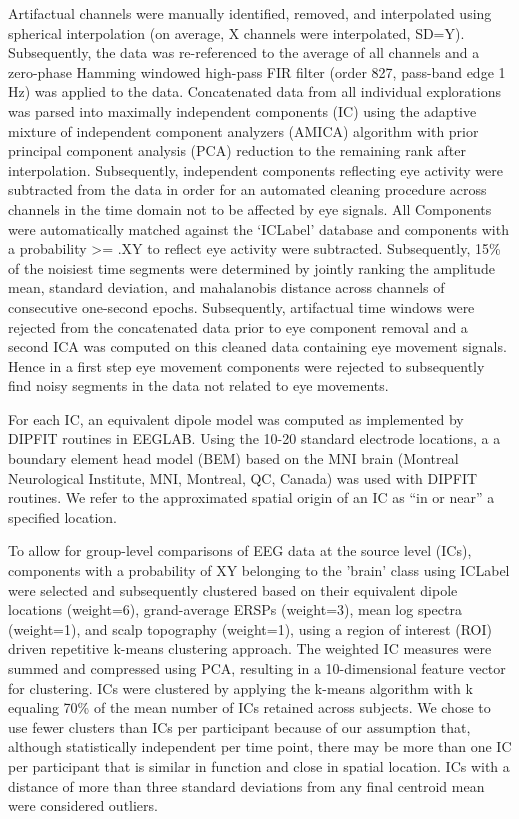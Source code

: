 Artifactual channels were manually identified, removed, and interpolated using spherical interpolation (on average, X channels were interpolated, SD=Y). Subsequently, the data was re-referenced to the average of all channels and a zero-phase Hamming windowed high-pass FIR filter (order 827, pass-band edge 1 Hz) was applied to the data. Concatenated data from all individual explorations was parsed into maximally independent components (IC) using the adaptive mixture of independent component analyzers (AMICA) algorithm with prior principal component analysis (PCA) reduction to the remaining rank after interpolation\citep{Palmer2011}. Subsequently, independent components reflecting eye activity were subtracted from the data in order for an automated cleaning procedure across channels in the time domain not to be affected by eye signals. All Components were automatically matched against the ‘ICLabel’ database and components with a probability >= .XY to reflect eye activity were subtracted\citep{iclabel}. Subsequently, 15\% of the noisiest time segments were determined by jointly ranking the amplitude mean, standard deviation, and mahalanobis distance across channels of consecutive one-second epochs\citep{cleaning_fh2018}. Subsequently, artifactual time windows were rejected from the concatenated data prior to eye component removal and a second ICA was computed on this cleaned data containing eye movement signals. Hence in a first step eye movement components were rejected to subsequently find noisy segments in the data not related to eye movements.

For each IC, an equivalent dipole model was computed as implemented by DIPFIT routines in EEGLAB. Using the 10-20 standard electrode locations, a a boundary element head model (BEM) based on the MNI brain (Montreal Neurological Institute, MNI, Montreal, QC, Canada) was used with DIPFIT routines. We refer to the approximated spatial origin of an IC as “in or near” a specified location.

To allow for group-level comparisons of EEG data at the source level (ICs), components with a probability of XY belonging to the 'brain' class using ICLabel were selected and subsequently clustered based on their equivalent dipole locations (weight=6), grand-average ERSPs (weight=3), mean log spectra (weight=1), and scalp topography (weight=1), using a region of interest (ROI) driven repetitive k-means clustering approach\citep{cleaning_FH2018}. The weighted IC measures were summed and compressed using PCA, resulting in a 10-dimensional feature vector for clustering. ICs were clustered by applying the k-means algorithm with k equaling 70\% of the mean number of ICs retained across subjects. We chose to use fewer clusters than ICs per participant because of our assumption that, although statistically independent per time point, there may be more than one IC per participant that is similar in function and close in spatial location. ICs with a distance of more than three standard deviations from any final centroid mean were considered outliers.

